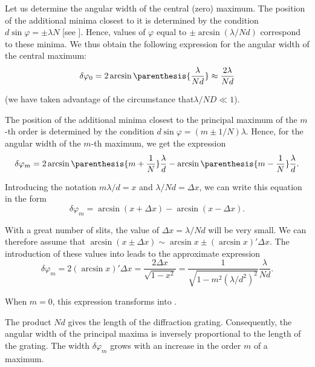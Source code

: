 Let us determine the angular width of the central (zero) maximum.
The position of the additional minima closest to it is determined by the condition $d\sin\varphi= \pm\lambda N$ [see ].
Hence, values of $\varphi$ equal to $\pm\arcsin(\lambda/Nd)$ correspond to these minima.
We thus obtain the following expression for the angular width of the central maximum:
\begin{equation}\label{eq:18_46}
	\delta\varphi_0 = 2 \arcsin\parenthesis{\frac{\lambda}{Nd}} \approx \frac{2\lambda}{Nd}
\end{equation}

\noindent
(we have taken advantage of the circumstance that$\lambda/ND \ll 1$).

The position of the additional minima closest to the principal maximum of the $m$-th order is determined by the condition $d\sin\varphi = (m \pm 1/N)\lambda$.
Hence, for the angular width of the $m$-th maximum, we get the expression
\begin{equation*}
	\delta\varphi_m = 2 \arcsin\parenthesis{m + \frac{1}{N}} \frac{\lambda}{d} - \arcsin\parenthesis{m - \frac{1}{N}} \frac{\lambda}{d}.
\end{equation*}

\noindent
Introducing the notation $m\lambda/d=x$ and $\lambda/Nd=\Delta{x}$, we can write this equation in the form
\begin{equation}\label{eq:18_47}
	\delta\varphi_m = \arcsin(x + \Delta{x}) - \arcsin(x - \Delta{x}).
\end{equation}

\noindent
With a great number of slits, the value of $\Delta{x}=\lambda/Nd$ will be very small.
We can therefore assume that $\arcsin(x\pm\Delta{x})\sim\arcsin x \pm (\arcsin x)' \Delta{x}$.
The introduction of these values into 
leads to the approximate expression
\begin{equation}\label{eq:18_48}
	\delta\varphi_m = 2 (\arcsin x)' \Delta{x} = \frac{2 \Delta{x}}{\sqrt{1-x^2}} = \frac{1}{\sqrt{1 - m^2(\lambda/d^2)^2}} \frac{\lambda}{Nd}.
\end{equation}

\noindent
When $m=0$, this expression transforms into .

The product $Nd$ gives the length of the diffraction grating.
Consequently, the angular width of the principal maxima is inversely proportional to the length of the grating.
The width $\delta{\varphi_m}$ grows with an increase in the order $m$ of a maximum.

